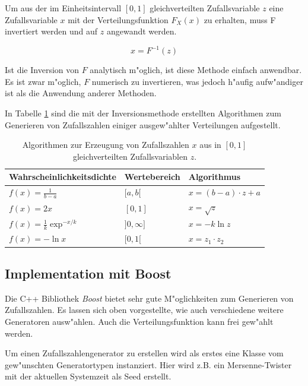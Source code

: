 \begin{refsection}
Um aus der im Einheitsintervall $[0,1]$ gleichverteilten Zufallsvariable
$z$  eine Zufallsvariable $x$ mit der Verteilungsfunktion $F_X(x)$
zu erhalten, muss F invertiert werden und auf $z$ angewandt werden.

\begin{equation}
	x = F^{-1}(z)
\end{equation}

Ist die Inversion von $F$ analytisch m"oglich, ist diese Methode einfach
anwendbar. Es ist zwar m"oglich, $F$ numerisch zu invertieren, was jedoch
h"aufig aufw"andiger ist als die Anwendung anderer Methoden.

In Tabelle \ref{tab:verteilungen_erzeugen} sind die mit der
Inversionsmethode erstellten Algorithmen zum Generieren von Zufallszahlen
einiger ausgew"ahlter Verteilungen aufgestellt.

\begin{table}[htbp]
	\centering
	\renewcommand{\arraystretch}{1.5}
	\begin{tabular}{|l|l|l|}
		\hline
		Wahrscheinlichkeitsdichte & Wertebereich & Algorithmus \\ \hline
		$f(x) = \frac{1}{b-a}$ & $[a,b[$ & $x = (b-a) \cdot z + a$ \\ \hline
		$f(x) = 2x$ & $[0,1]$ & $x = \sqrt{z}$ \\ \hline
		$f(x) = \frac{1}{k} \exp^{-x/k}$ & $]0,\infty]$ & $x = -k \ln z$ \\ \hline
		$f(x) = - \ln x$ & $[0,1[$ & $x = z_1 \cdot z_2$ \\ \hline
	\end{tabular}
	\caption{Algorithmen zur Erzeugung von Zufallszahlen $x$ aus in $[0,1]$ gleichverteilten Zufallsvariablen $z$.}
	\label{tab:verteilungen_erzeugen}
	\renewcommand{\arraystretch}{1.0}
\end{table}

\subsection{Implementation mit Boost}
Die C++ Bibliothek \textit{Boost} bietet sehr gute M"oglichkeiten zum
Generieren von Zufallszahlen. Es lassen sich oben vorgestellte, wie auch
verschiedene weitere Generatoren ausw"ahlen. Auch die Verteilungsfunktion
kann frei gew"ahlt werden.

Um einen Zufallszahlengenerator zu erstellen wird als erstes eine
Klasse vom gew"unschten Generatortypen instanziert. Hier wird z.B. ein
Mersenne-Twister mit der aktuellen Systemzeit als Seed erstellt.


\end{refsection}

